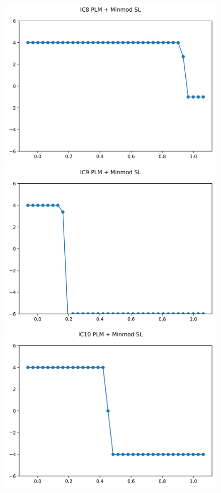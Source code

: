 \documentclass{article}
\begin{document}
\begin{figure}[t]
        \includegraphics[width=.95\textwidth]{../../code/unsafe_IC8Methodpm_plot.png}
        \includegraphics[width=.95\textwidth]{../../code/unsafe_IC9Methodpm_plot.png}
        \includegraphics[width=.95\textwidth]{../../code/unsafe_IC10Methodpm_plot.png}

\end{figure}
\end{document}
